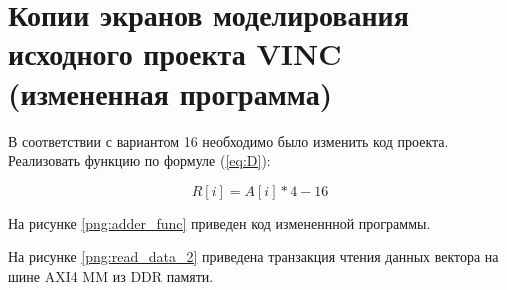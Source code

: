 \chapter*{Копии экранов моделирования исходного проекта VINC (измененная программа)}

В соответствии с вариантом 16 необходимо было изменить код проекта. Реализовать функцию по формуле (\ref{eq:D}):

\begin{equation}
	\label{eq:D}
	R[i] = A[i]*4 - 16
\end{equation}

На рисунке \ref{png:adder_func} приведен код измененнной программы.

\begin{figure}[H]
	\captionsetup{justification=centering}
\end{figure}

На рисунке \ref{png:read_data_2} приведена транзакция чтения данных вектора на шине AXI4 MM из DDR памяти.
\begin{figure}[H]
	\captionsetup{justification=centering}
\end{figure}

